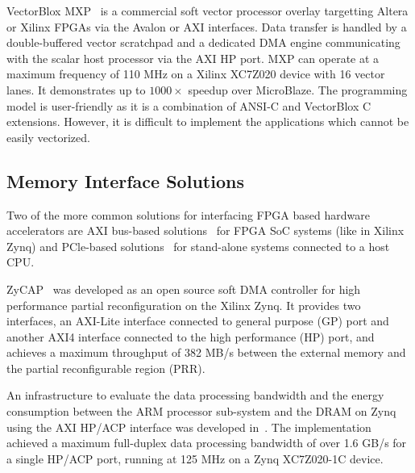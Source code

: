 VectorBlox MXP~\cite{severance2013embedded} is a commercial soft vector processor overlay targetting Altera or Xilinx FPGAs via the Avalon or AXI interfaces. 
Data transfer is handled by a double-buffered vector scratchpad and a dedicated DMA engine communicating with the scalar host processor via the AXI HP port. 
MXP can operate at a maximum frequency of 110 MHz on a Xilinx XC7Z020 device with 16 vector lanes. 
It demonstrates up to $1000\times$ speedup over MicroBlaze. 
The programming model is user-friendly as it is a combination of ANSI-C and VectorBlox C extensions.  
However, it is difficult to implement the applications which cannot be easily vectorized. 


\subsection{Memory Interface Solutions} 
Two of the more common solutions for interfacing FPGA based hardware accelerators are AXI bus-based solutions~\cite{vipin2014zycap, sadri2013energy, xillybus2018} for FPGA SoC systems (like in Xilinx Zynq) and PCle-based solutions~\cite{xillybus2018, vipin2014dyract, gong2014efficient, jacobsen2015riffa} for stand-alone systems connected to a host CPU. 

ZyCAP~\cite{vipin2014zycap} was developed as an open source soft DMA controller for high performance partial reconfiguration on the Xilinx Zynq. 
It provides two interfaces, an AXI-Lite interface connected to general purpose (GP) port and another AXI4 interface connected to the high performance (HP) port, and achieves a maximum throughput of 382 MB/s between the external memory and the partial reconfigurable region (PRR). 

An infrastructure to evaluate the data processing bandwidth and the energy consumption between the ARM processor sub-system and the DRAM on Zynq using the AXI HP/ACP interface was developed in~\cite{sadri2013energy}.
The implementation achieved a maximum full-duplex data processing bandwidth of over 1.6 GB/s for a single HP/ACP port, running at 125 MHz on a Zynq XC7Z020-1C device.



